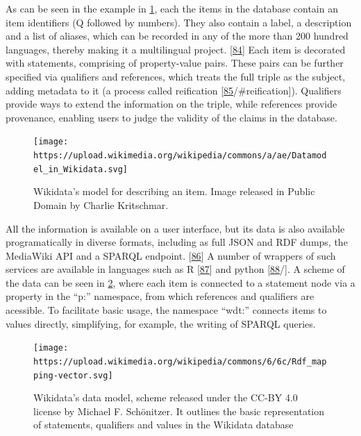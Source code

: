 As can be seen in the example in \ref{fig:douglas_adams}, each the items in the database contain an item identifiers (Q followed by numbers).
They also contain a label, a description and a list of aliases, which can be recorded in any of the more than 200 hundred languages, thereby making it a multilingual project. {[}\protect\hyperlink{ref-S1Lksw7i}{84}{]}
Each item is decorated with statements, comprising of property-value pairs.
These pairs can be further specified via qualifiers and references, which treats the full triple as the subject, adding metadata to it (a process called reification {[}\protect\hyperlink{ref-ZhP1mKyl}{85}/\#reification{]}).
Qualifiers provide ways to extend the information on the triple, while references provide provenance, enabling users to judge the validity of the claims in the database.

\begin{figure}
\hypertarget{fig:douglas_adams}{%
\centering
\texttt{[image: https://upload.wikimedia.org/wikipedia/commons/a/ae/Datamodel\_in\_Wikidata.svg]}
\caption{Wikidata's model for describing an item. Image released in Public Domain by Charlie Kritschmar.}\label{fig:douglas_adams}
}
\end{figure}

All the information is available on a user interface, but its data is also available programatically in diverse formats, including as full JSON and RDF dumps, the MediaWiki API and a SPARQL endpoint. {[}\protect\hyperlink{ref-4wSLyAPr}{86}{]}
A number of wrappers of such services are available in languages such as R {[}\protect\hyperlink{ref-1HghnypzG}{87}{]} and python {[}\protect\hyperlink{ref-VKWfrtR1}{88}/{]}.
A scheme of the data can be seen in \ref{fig:datamodel}, where each item is connected to a statement node via a property in the ``p:'' namespace, from which references and qualifiers are acessible.
To facilitate basic usage, the namespace ``wdt:'' connects items to values directly, simplifying, for example, the writing of SPARQL queries.

\begin{figure}
\hypertarget{fig:datamodel}{%
\centering
\texttt{[image: https://upload.wikimedia.org/wikipedia/commons/6/6c/Rdf\_mapping-vector.svg]}
\caption{Wikidata's data model, scheme released under the CC-BY 4.0 license by Michael F. Schönitzer. It outlines the basic representation of statements, qualifiers and values in the Wikidata database}\label{fig:datamodel}
}
\end{figure}

